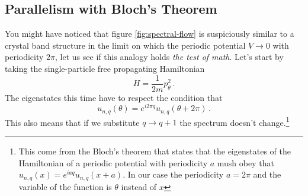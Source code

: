     \subsection*{Parallelism with Bloch's Theorem}
    
        You might have noticed that figure \ref{fig:spectral-flow} is suspiciously similar to a crystal band structure in the limit on which the periodic potential $V\to 0$ with periodicity $2\pi$, let us see if this analogy holds \textit{the test of math}. Let's start by taking the single-particle free propagating Hamiltonian 
        \[
            H=\frac 1{2m}p_\theta^2\,.
        \]
        The eigenstates this time have to respect the condition that 
        \begin{equation}
        u_{n,q}(\theta)=e^{i2\pi q}u_{n,q}(\theta+2\pi)\,.
        \end{equation}
        This also means that if we substitute $q\to q+1$ the spectrum doesn't change.\footnote{This come from the Bloch's theorem that states that the eigenstates of the Hamiltonian of a periodic potential with periodicity $a$ mush obey that $u_{n,q}(x)=e^{iaq}u_{n,q}(x+a)$. In our case the periodicity $a=2\pi$ and the variable of the function is $\theta$ instead of $x$}\\
